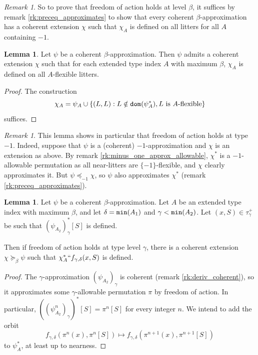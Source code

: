 \documentclass{article}
\newif\ifshowannotations
\newcommand{\annot}[1]{\ifshowannotations\marginpar{#1}\fi}
\theoremstyle{definition}
\newtheorem{lemma}[theorem]{Lemma}
\theoremstyle{remark}
\newtheorem{remark}[theorem]{Remark}
\begin{document}
{\begin{remark}
  So to prove that freedom of action holds at level $\beta$, it suffices by remark \ref{rk:preceq_approximates} to show that every coherent $\beta$-approximation has a coherent extension $\chi$ such that $\chi_A$ is defined on all litters for all $A$ containing $-1$.
  \annot{\small We believe that this text is correct with respect to the new inductive hypotheses and definitions.}
\end{remark}
\begin{lemma}\label{lem:foa_flexible}
  Let $\psi$ be a coherent $\beta$-approximation.
  Then $\psi$ admits a coherent extension $\chi$ such that for each extended type index $A$ with maximum $\beta$, $\chi_A$ is defined on all $A$-flexible litters.
\end{lemma}
\begin{proof}
  The construction
  $$ \chi_A = \psi_A \cup \{ (L, L) : L \notin {\tt dom}(\psi_A^*), L\ \mathrm{is}\ A\mathrm{\mbox{-flexible}} \} $$
  suffices.
\end{proof}
\begin{remark}
  This lemma shows in particular that freedom of action holds at type $-1$.
  Indeed, suppose that $\psi$ is a (coherent) $-1$-approximation and $\chi$ is an extension as above.
  By remark \ref{rk:minus_one_approx_allowable}, $\chi^*$ is a $-1$-allowable permutation as all near-litters are $\{-1\}$-flexible, and $\chi$ clearly approximates it.
  But $\psi \preceq_{-1} \chi$, so $\psi$ also approximates $\chi^*$ (remark \ref{rk:preceq_approximates}).
\end{remark}
\begin{lemma}\label{lem:foa_inflexible}
  Let $\psi$ be a coherent $\beta$-approximation.
  Let $A$ be an extended type index with maximum $\beta$, and let $\delta = {\tt min}(A_1)$ and $\gamma < {\tt min}(A_2)$.
  Let $(x, S) \in \tau_\gamma^+$ be such that $(\psi_{A_2})_\gamma^*[S]$ is defined.

  Then if freedom of action holds at type level $\gamma$, there is a coherent extension $\chi \succeq_\beta \psi$ such that $
  \chi_A^* `` f_{\gamma,\delta}(x, S)$ is defined.
\end{lemma}
\begin{proof}
  The $\gamma$-approximation $(\psi_{A_2})_\gamma$ is coherent (remark \ref{rk:deriv_coherent}), so it approximates some $\gamma$-allowable permutation $\pi$ by freedom of action.
  In particular, $((\psi_{A_2}^n)_\gamma)^*[S] = \pi^n[S]$ for every integer $n$.
  We intend to add the orbit
  $$ f_{\gamma,\delta}(\pi^n(x), \pi^n[S]) \mapsto f_{\gamma,\delta}(\pi^{n+1}(x), \pi^{n+1}[S]) $$
  to $\psi_A^*$, at least up to nearness.


\end{proof}}
\end{document}
